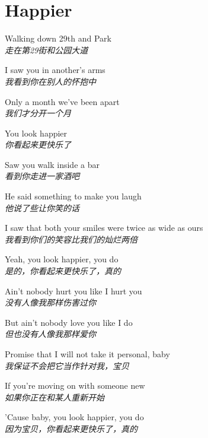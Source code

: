 \section{Happier}

\thispagestyle{empty}


\begin{spacing}{1.5}
\begin{flushleft}
Walking down 29th and Park\\
\textit{走在第29街和公园大道}\lyricspace

I saw you in another's arms\\
\textit{我看到你在别人的怀抱中}\lyricspace

Only a month we've been apart\\
\textit{我们才分开一个月}\lyricspace

You look happier\\
\textit{你看起来更快乐了}\lyricspace

Saw you walk inside a bar\\
\textit{看到你走进一家酒吧}\lyricspace

He said something to make you laugh\\
\textit{他说了些让你笑的话}\lyricspace

I saw that both your smiles were twice as wide as ours\\
\textit{我看到你们的笑容比我们的灿烂两倍}\lyricspace

Yeah, you look happier, you do\\
\textit{是的，你看起来更快乐了，真的}\lyricspace

Ain't nobody hurt you like I hurt you\\
\textit{没有人像我那样伤害过你}\lyricspace

But ain't nobody love you like I do\\
\textit{但也没有人像我那样爱你}\lyricspace

Promise that I will not take it personal, baby\\
\textit{我保证不会把它当作针对我，宝贝}\lyricspace

If you're moving on with someone new\\
\textit{如果你正在和某人重新开始}\lyricspace

'Cause baby, you look happier, you do\\
\textit{因为宝贝，你看起来更快乐了，真的}\lyricspace


\end{flushleft}
\end{spacing}
